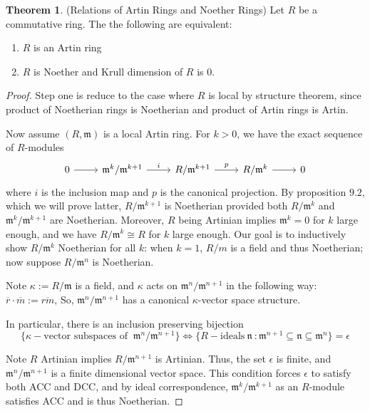 \documentclass{article}
\theoremstyle{definition}
\newtheorem{theorem}{Theorem}[section]
\theoremstyle{definition}
\theoremstyle{definition}
\theoremstyle{definition}
\theoremstyle{definition}
\theoremstyle{definition}
\theoremstyle{definition}
\begin{document}
\begin{tcolorbox}[colback=red!5!white,colframe=red!30!white]
\begin{theorem}
(Relations of Artin Rings and Noether Rings) Let $R$ be a commutative ring. The the following are equivalent: 
\begin{enumerate}
    \item $R$ is an Artin ring
    \item $R$ is Noether and Krull dimension of $R$ is $0$. 
\end{enumerate}
\end{theorem}
\end{tcolorbox}
\begin{proof}


Step one is reduce to the case where $R$ is local by structure theorem, since product of Noetherian rings is Noetherian and product of Artin rings is Artin. 
    
    
 Now assume $(R,\mathfrak{m})$ is a local Artin ring. For $k>0$, we have the exact sequence of $R$-modules
    \[\begin{tikzcd}
    0\arrow[r]&\mathfrak{m}^k/\mathfrak{m}^{k+1}\arrow[r,"i"]&R/\mathfrak{m}^{k+1}\arrow[r,"p"]&R/\mathfrak{m}^k\arrow[r]&0
    \end{tikzcd}\]
    where $i$ is the inclusion map and $p$ is the canonical projection. By proposition $9.2$, which we will prove latter, $R/ \mathfrak{m}^{k+1}$ is Noetherian provided both $R/ \mathfrak{m}^k$ and $\mathfrak{m}^k/\mathfrak{m}^{k+1}$ are Noetherian. Moreover, $R$ being Artinian implies $\mathfrak{m}^k=0$ for $k$ large enough, and we have $R/\mathfrak{m}^k\cong R$ for $k$ large enough. Our goal is to inductively show $R/\mathfrak{m}^{k}$ Noetherian for all $k$:  when $k=1$, $R/m$ is a field and thus Noetherian; now suppose $R/\mathfrak{m}^n$ is Noetherian. 

    Note $\kappa:= R/\mathfrak{m}$ is a field, and $\kappa$ acts on $\mathfrak{m}^n/\mathfrak{m}^{n+1}$ in the following way: $\overline{r}\cdot \overline{m} :=\overline{rm}$, So, $\mathfrak{m}^n/\mathfrak{m}^{n+1}$ has a canonical $\kappa$-vector space structure. 
    
    
    In particular, there is an inclusion preserving bijection 
    \[
        \{ \kappa -\textrm{vector subspaces of }\ \mathfrak{m}^n/\mathfrak{m}^{n+1} \} \iff \{ R-\textrm{ideals} \ \mathfrak{n} \ : \mathfrak{m}^{n+1}\subseteq \mathfrak{n}\subseteq \mathfrak{m}^n \}=\epsilon
    \]
    

    Note $R$ Artinian implies $R/\mathfrak{m}^{n+1}$ is Artinian. Thus, the set $\epsilon$ is finite, and $\mathfrak{m}^{n}/\mathfrak{m}^{n+1}$ is a finite dimensional vector space. This condition forces $\epsilon$ to satisfy both ACC and DCC, and by ideal correspondence, $\mathfrak{m}^k/\mathfrak{m}^{k+1}$ as an $R$-module satisfies ACC and is thus Noetherian. 



\end{proof}
\end{document}
